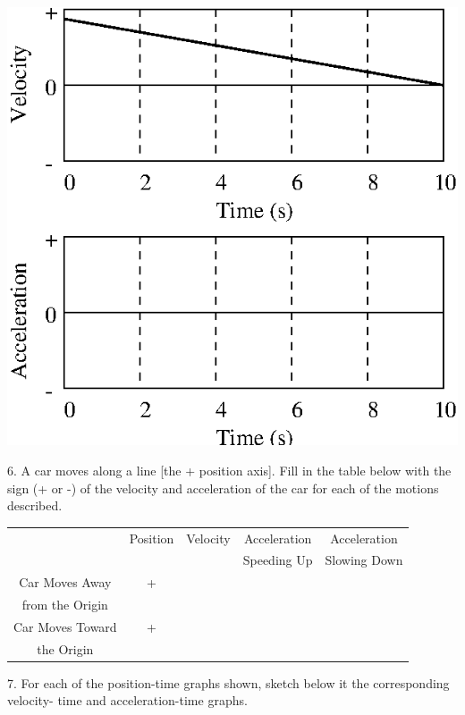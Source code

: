 \vspace{0.3cm}
{\par\centering \includegraphics{slowing/slowing_fig10.eps} \par}
\vspace{0.3cm}

6. A car moves along a line {[}the + position axis{]}. Fill in the table below
with the sign (+ or -) of the velocity and acceleration of the car for each
of the motions described.

\vspace{0.3cm}
{\centering \begin{tabular}{|c|c|c|c|c|}
\hline 
&
Position&
Velocity&
Acceleration&
Acceleration\\
&
&
&
Speeding Up&
Slowing Down\\
\hline 
Car Moves Away&
+&
&
&
\\
from the Origin&
&
&
&
\\
\hline 
Car Moves Toward&
+&
&
&
\\
the Origin&
&
&
&
\\
\hline 
\end{tabular}\par}
\vspace{0.3cm}

\newpage

7. For each of the position-time graphs shown, sketch below it the corresponding
velocity- time and acceleration-time graphs.

